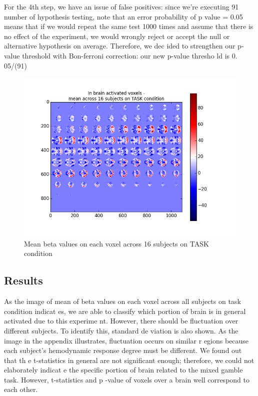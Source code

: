 For the 4th step, we have an issue of false positives: since we're executing 91 number
 of hypothesis testing, note that an error probability of p value = 0.05 means that if we would 
 repeat the same test 1000 times and assume that there is no effect of the experiment, we would
  wrongly reject or accept the null or alternative hypothesis on average. Therefore, we dec
  ided to strengthen our p-value threshold with Bon-ferroni correction: our new p-value thresho
  ld is 0.
  05/(91)

\begin{figure}[H] 
\centering \includegraphics[scale=0.5]{../fig/multi_beta/mean_task.png}	 
\caption{Mean beta values on each voxel across 16 subjects on TASK condition}
\end{figure} 


\subsection {Results}
As the image of mean of beta values on each voxel across all subjects on task condition indicat
es, we are able to classify which portion of brain is in general activated due to this experime
nt. However, there should be fluctuation over different subjects. To identify this, standard de
viation is also shown. As the image in the appendix illustrates, fluctuation occurs on similar r
egions because each subject's hemodynamic response degree must be different. We found out that th
e t-statistics in general are not significant enough; therefore, we could not elaborately indicat
e the specific portion of brain related to the mixed gamble task. However, t-statistics and p
-value of voxels over a brain well correspond to each other.





